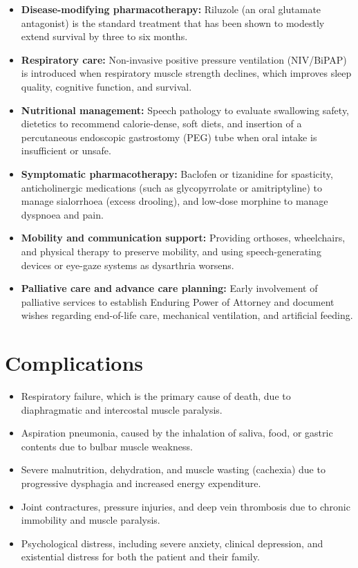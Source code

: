 \begin{itemize}
    \item \textbf{Disease-modifying pharmacotherapy:} Riluzole (an oral glutamate antagonist) is the standard treatment that has been shown to modestly extend survival by three to six months.
    \item \textbf{Respiratory care:} Non-invasive positive pressure ventilation (NIV/BiPAP) is introduced when respiratory muscle strength declines, which improves sleep quality, cognitive function, and survival.
    \item \textbf{Nutritional management:} Speech pathology to evaluate swallowing safety, dietetics to recommend calorie-dense, soft diets, and insertion of a percutaneous endoscopic gastrostomy (PEG) tube when oral intake is insufficient or unsafe.
    \item \textbf{Symptomatic pharmacotherapy:} Baclofen or tizanidine for spasticity, anticholinergic medications (such as glycopyrrolate or amitriptyline) to manage sialorrhoea (excess drooling), and low-dose morphine to manage dyspnoea and pain.
    \item \textbf{Mobility and communication support:} Providing orthoses, wheelchairs, and physical therapy to preserve mobility, and using speech-generating devices or eye-gaze systems as dysarthria worsens.
    \item \textbf{Palliative care and advance care planning:} Early involvement of palliative services to establish Enduring Power of Attorney and document wishes regarding end-of-life care, mechanical ventilation, and artificial feeding.
\end{itemize}

\section*{Complications}
\begin{itemize}
    \item Respiratory failure, which is the primary cause of death, due to diaphragmatic and intercostal muscle paralysis.
    \item Aspiration pneumonia, caused by the inhalation of saliva, food, or gastric contents due to bulbar muscle weakness.
    \item Severe malnutrition, dehydration, and muscle wasting (cachexia) due to progressive dysphagia and increased energy expenditure.
    \item Joint contractures, pressure injuries, and deep vein thrombosis due to chronic immobility and muscle paralysis.
    \item Psychological distress, including severe anxiety, clinical depression, and existential distress for both the patient and their family.
\end{itemize}

